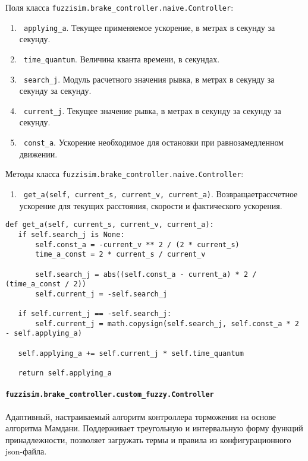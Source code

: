 Поля класса \lstinline!fuzzisim.brake_controller.naive.Controller!:
\begin{enumerate}[label=\arabic*)]
	\item \lstinline! applying_a!. Текущее применяемое ускорение, в метрах в секунду за секунду.
	\item \lstinline! time_quantum!. Величина кванта времени, в секундах.
	\item \lstinline! search_j!. Модуль расчетного значения рывка, в метрах в секунду за секунду за секунду.
	\item \lstinline! current_j!. Текущее значение рывка, в метрах в секунду за секунду за секунду.
	\item \lstinline! const_a!. Ускорение необходимое для остановки при равнозамедленном движении.
\end{enumerate}


Методы класса \lstinline!fuzzisim.brake_controller.naive.Controller!:
\begin{enumerate}[label=\arabic*)]
	\item \lstinline! get_a(self, current_s, current_v, current_a)!. Возвращаетрассчетное ускорение для текущих расстояния, скорости и фактического ускорения.
\end{enumerate}

\begin{lstlisting}[style=pythonstyle,caption={  }, label=lst:func:1]
def get_a(self, current_s, current_v, current_a):
   if self.search_j is None:
       self.const_a = -current_v ** 2 / (2 * current_s)
       time_a_const = 2 * current_s / current_v

       self.search_j = abs((self.const_a - current_a) * 2 / (time_a_const / 2))
       self.current_j = -self.search_j

   if self.current_j == -self.search_j:
       self.current_j = math.copysign(self.search_j, self.const_a * 2 - self.applying_a)

   self.applying_a += self.current_j * self.time_quantum

   return self.applying_a
\end{lstlisting}



\paragraph{\lstinline!fuzzisim.brake_controller.custom_fuzzy.Controller!}
Адаптивный, настраиваемый алгоритм контроллера торможения на основе алгоритма Мамдани. Поддерживает треугольную и интервальную форму функций принадлежности, позволяет загружать термы и правила из конфигурационного json-файла.

